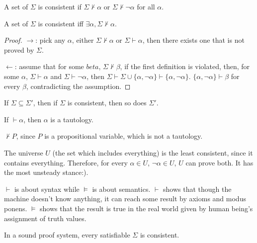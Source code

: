 
\begin{definition}[consistent]
  A set of \wff $\Sigma$ is consistent if $\Sigma\nvdash\alpha$ or $\Sigma\nvdash\neg\alpha$ for all \wff $\alpha$.
\end{definition}

\begin{claim}
  A set of \wff $\Sigma$ is consistent iff $\exists\alpha, \Sigma\nvdash\alpha$.
\end{claim}

\begin{proof}

  $\rightarrow$: pick any $\alpha$, either $\Sigma\nvdash\alpha$ or $\Sigma\vdash\alpha$, then there exists one that is not proved by $\Sigma$.

$\leftarrow$: assume that for some $beta$, $\Sigma\nvdash\beta$, if the first definition is violated, then, for some $\alpha$, $\Sigma\vdash\alpha$ and $\Sigma\vdash\neg\alpha$, then $\Sigma\vdash\Sigma\cup\{\alpha,\neg\alpha\}\vdash\{\alpha,\neg\alpha\}$. $\{\alpha, \neg\alpha\}\vdash\beta$ for every $\beta$, contradicting the assumption.
\end{proof}

\begin{corollary}
If $\Sigma\subseteq\Sigma'$, then if $\Sigma$ is consistent, then so does $\Sigma'$.
\end{corollary}

\begin{definition}[Soundness]
If $\vdash\alpha$, then $\alpha$ is a tautology.
\end{definition}

\begin{corollary}
$\nvdash P$, since $P$ is a propositional variable, which is not a tautology.
\end{corollary}

The universe $U$ (the set which includes everything) is the least consistent, since it contains everything. Therefore, for every $\alpha\in U$, $\neg\alpha\in U$, $U$ can prove both. It has the most unsteady stance:).

$\vdash$ is about syntax while $\vDash$ is about semantics. $\vdash$ shows that though the machine doesn't know anything, it can reach some result by axioms and modus ponens. $\vDash$ shows that the result is true in the real world given by human being's assignment of truth values.

\begin{theorem}
In a sound proof system, every satisfiable $\Sigma$ is consistent. 
\end{theorem}

